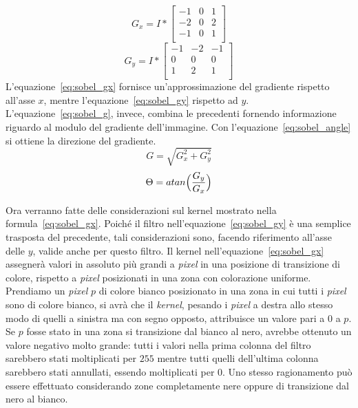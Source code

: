 \begin{equation} \label{eq:sobel_gx}
  G_x = 
  I
  *
  \begin{bmatrix}
    -1&0&1\\
    -2&0&2\\
    -1&0&1\\
  \end{bmatrix}
\end{equation}
\begin{equation} \label{eq:sobel_gy}
  G_y = 
  I
  *
  \begin{bmatrix}
    -1&-2&-1\\
    0&0&0\\
    1&2&1\\
  \end{bmatrix}
\end{equation}
L'equazione~\ref{eq:sobel_gx} fornisce un'approssimazione del gradiente rispetto all'asse $x$, mentre l'equazione~\ref{eq:sobel_gy} rispetto ad $y$.
L'equazione~\ref{eq:sobel_g}, invece, combina le precedenti fornendo informazione riguardo al modulo del gradiente dell'immagine.
Con l'equazione~\ref{eq:sobel_angle} si ottiene la direzione del gradiente.
\begin{equation} \label{eq:sobel_g}
  G = \sqrt{G_x^2 + G_y^2}
\end{equation}
\begin{equation} \label{eq:sobel_angle}
  \Theta = atan{\Bigl( \frac{G_y}{G_x} \Bigr)}
\end{equation}

Ora verranno fatte delle considerazioni sul kernel mostrato nella formula~\ref{eq:sobel_gx}.
Poiché il filtro nell'equazione~\ref{eq:sobel_gy} è una semplice trasposta del precedente, tali considerazioni sono, facendo riferimento all'asse delle $y$, valide anche per questo filtro.
Il kernel nell'equazione~\ref{eq:sobel_gx} assegnerà valori in assoluto più grandi a \textit{pixel} in una posizione di transizione di colore, rispetto a \textit{pixel} posizionati in una zona con colorazione uniforme.
Prendiamo un \textit{pixel} $p$ di colore bianco posizionato in una zona in cui tutti i \textit{pixel} sono di colore bianco, si avrà che il \textit{kernel}, pesando i \textit{pixel} a destra allo stesso modo di quelli a sinistra ma con segno opposto, attribuisce un valore pari a $0$ a $p$.
Se $p$ fosse stato in una zona si transizione dal bianco al nero, avrebbe ottenuto un valore negativo molto grande:
tutti i valori nella prima colonna del filtro sarebbero stati moltiplicati per $255$ mentre tutti quelli dell'ultima colonna sarebbero stati annullati, essendo moltiplicati per $0$.
Uno stesso ragionamento può essere effettuato considerando zone completamente nere oppure di transizione dal nero al bianco.

